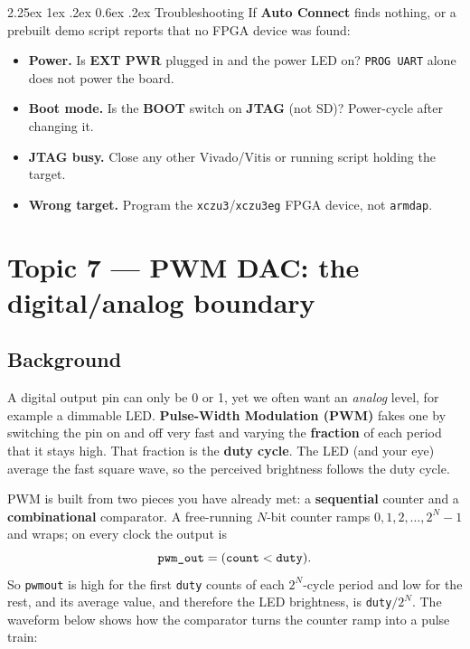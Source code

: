 \documentclass[11pt]{article}
\makeatletter
\newcommand{\nav}[1]{\textsf{\textbf{#1}}}
\renewcommand{\_}{\textunderscore\allowbreak}
\renewcommand\paragraph{\@startsection{paragraph}{4}{\z@}%
  {2.25ex \@plus 1ex \@minus .2ex}%
  {0.6ex \@plus .2ex}%
  {\normalfont\normalsize\bfseries}}
\makeatother
\begin{document}
\paragraph{Troubleshooting}
If \nav{Auto Connect} finds nothing, or a prebuilt demo script reports that no FPGA device was found:
\begin{itemize}[noitemsep]
  \item \textbf{Power.} Is \textbf{EXT PWR} plugged in and the power LED on? \texttt{PROG UART} alone does not power the board.
  \item \textbf{Boot mode.} Is the \textbf{BOOT} switch on \textbf{JTAG} (not SD)? Power-cycle after changing it.
  \item \textbf{JTAG busy.} Close any other Vivado/Vitis or running script holding the target.
  \item \textbf{Wrong target.} Program the \texttt{xczu3}/\texttt{xczu3eg} FPGA device, not \texttt{arm\_dap}.
\end{itemize}

\newpage
\section{Topic 7 --- PWM DAC: the digital/analog boundary}

\subsection{Background}
A digital output pin can only be 0 or 1, yet we often want an \emph{analog} level, for example a
dimmable LED. \textbf{Pulse-Width Modulation (PWM)} fakes one by switching the pin on and off very fast and
varying the \textbf{fraction} of each period that it stays high. That fraction is the \textbf{duty cycle}.
The LED (and your eye) average the fast square wave, so the perceived brightness follows the duty cycle.

PWM is built from two pieces you have already met: a \textbf{sequential} counter and a \textbf{combinational}
comparator. A free-running $N$-bit counter ramps $0, 1, 2, \ldots, 2^N{-}1$ and wraps; on every clock the
output is
\[ \texttt{pwm\_out} = (\texttt{count} < \texttt{duty}). \]
So \texttt{pwm\_out} is high for the first \texttt{duty} counts of each $2^N$-cycle period and low for the
rest, and its average value, and therefore the LED brightness, is \texttt{duty}$/2^N$. The waveform below
shows how the comparator turns the counter ramp into a pulse train:
\end{document}

